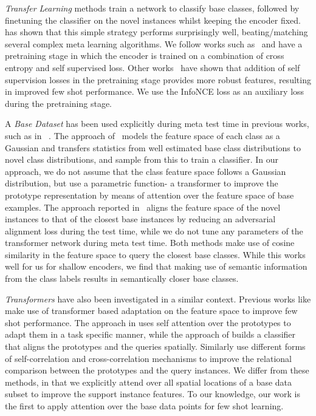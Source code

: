 \documentclass{bmvc2k}
\begin{document}
\textit{Transfer Learning} methods train a network to classify base classes, followed by finetuning the classifier on the novel instances whilst keeping the encoder fixed. ~\cite{wang2019simpleshot,chen2018a} has shown that this simple strategy performs surprisingly well, beating/matching several complex meta learning algorithms. We follow works such as~\cite{ye2020few} and have a pretraining stage in which the encoder is trained on a combination of cross entropy and self supervised loss. Other works~\cite{su2020does,gidaris2019boosting,mangla2020charting,liu2021learning} have shown that addition of self supervision losses in the pretraining stage provides more robust features, resulting in improved few shot performance. We use the InfoNCE loss \cite{chen2020simple} as an auxiliary loss during the pretraining stage.


A \textit{Base Dataset} has been used explicitly during meta test time in previous works, such as in ~\cite{yang2021free,afrasiyabi2020associative}. The approach of~\cite{yang2021free} models the feature space of each class as a Gaussian and transfers statistics from well estimated base class distributions to novel class distributions, and sample from this to train a classifier. In our approach, we do not assume that the class feature space follows a Gaussian distribution, but use a parametric function- a transformer to improve the prototype representation by means of attention over the feature space of base examples. The approach reported in~\cite{afrasiyabi2020associative} aligns the feature space of the novel instances to that of the closest base instances by reducing an adversarial alignment loss during the test time, while we do not tune any parameters of the transformer network during meta test time. Both methods make use of cosine similarity in the feature space to query the closest base classes. While this works well for us for shallow encoders, we find that making use of semantic information from the class labels results in semantically closer base classes.


\textit{Transformers} have also been investigated in a similar context. Previous works like \cite{ye2020few,hou2019cross} make use of transformer based adaptation on the feature space to improve few shot performance. The approach in \cite{ye2020few} uses self attention over the prototypes to adapt them in a task specific manner, while the approach of \cite{doersch2020crosstransformers} builds a classifier that aligns the prototypes and the queries spatially. Similarly \cite{kang2021relational, li2019revisiting, wu2019parn, hao2019collect} use different forms of self-correlation and cross-correlation mechanisms to improve the relational comparison between the prototypes and the query instances. We differ from these methods, in that we  explicitly attend over all spatial locations of a base data subset to improve the support instance features. To our knowledge, our work is the first to apply attention over the base data points for few shot learning. 
\end{document}
